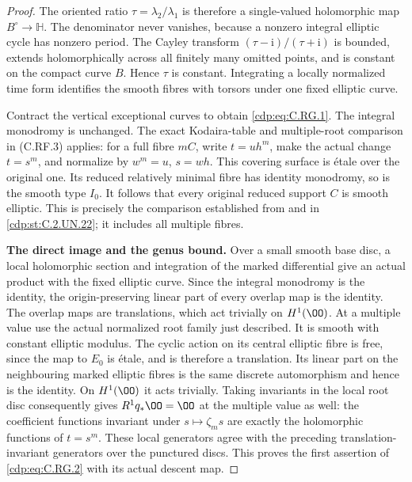 \begin{proof}
The oriented ratio $\tau=\lambda_2/\lambda_1$ is
therefore a single-valued holomorphic map
$B^\circ\to\mathbb H$. The denominator never vanishes,
because a nonzero integral elliptic cycle has nonzero
period. The Cayley transform $(\tau-\mathrm i)/(\tau+\mathrm i)$
is bounded, extends holomorphically across all finitely
many omitted points, and is constant on the compact
curve $B$. Hence $\tau$ is constant. Integrating a
locally normalized time form identifies the smooth
fibres with torsors under one fixed elliptic curve.

Contract the vertical exceptional curves to obtain
\eqref{cdp:eq:C.RG.1}. The integral monodromy is unchanged. The
exact Kodaira-table and multiple-root comparison in
(C.RF.3) applies: for a full fibre $mC$, write
$t=u h^m$, make the actual change $t=s^m$, and
normalize by $w^m=u$, $s=wh$. This covering surface
is \'etale over the original one. Its reduced
relatively minimal fibre has identity monodromy,
so is the smooth type $I_0$. It follows that every
original reduced support $C$ is smooth elliptic.
This is precisely the comparison established from
\cite[Theorem~6.2; Section~8(iv)(11), p.~585]{Kodaira1963II} and \citet[Section~2.3, pp.~5--6]{UlmerUrzua2021} in
\ref{cdp:st:C.2.UN.22}; it includes all multiple fibres.

\par\medskip\noindent\textbf{The direct image and the genus bound.}
Over a small smooth base disc, a local holomorphic
section and integration of the marked differential
give an actual product with the fixed elliptic curve.
Since the integral monodromy is the identity, the
origin-preserving linear part of every overlap map
is the identity. The overlap maps are translations,
which act trivially on $H^1(\OO)$.
At a multiple value use the actual normalized root
family just described. It is smooth with constant
elliptic modulus. The cyclic action on its central
elliptic fibre is free, since the map to $E_0$ is
\'etale, and is therefore a translation. Its linear
part on the neighbouring marked elliptic fibres
is the same discrete automorphism and hence is
the identity. On $H^1(\OO)$ it acts trivially.
Taking invariants in the local root disc consequently
gives $R^1q_*\OO=\OO$ at the multiple value as well:
the coefficient functions invariant under
$s\mapsto\zeta_m s$ are exactly the holomorphic
functions of $t=s^m$. These local generators agree
with the preceding translation-invariant generators
over the punctured discs. This proves the first
assertion of \eqref{cdp:eq:C.RG.2} with its actual descent map.


\end{proof}
